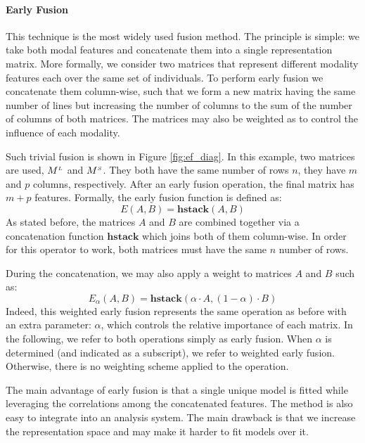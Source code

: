 \paragraph{Early Fusion}
This technique is the most widely used fusion method. The principle is simple: we take both modal features and concatenate them into a single representation matrix. More formally, we consider two matrices  that represent different modality features each  over the same set of individuals. To perform early fusion we concatenate them column-wise, such that we form a new matrix having the same number of lines but increasing the number of columns to the sum of the number of columns of both matrices. The matrices may also be weighted as to control the influence of each modality.

Such trivial fusion  is shown in Figure \ref{fig:ef_diag}. In this example, two  matrices are used, $M^{\scriptscriptstyle L}$ and $M^{\scriptscriptstyle S}$. They both have the same number of rows $n$, they have $m$ and $p$ columns, respectively. After an early fusion operation, the final matrix  has $m+p$ features. Formally, the early fusion function is defined as:
\begin{equation}
E(A,B) = \mathbf{hstack}(A , B)
\end{equation}
As stated before, the matrices $A$ and $B$ are combined together via a concatenation function $\mathbf{hstack}$ which joins both of them column-wise. In order for this operator to work, both matrices must have the same $n$ number of rows.

During the concatenation, we may also apply a weight to matrices $A$ and $B$ such as: 
\begin{equation}
E_\alpha(A,B) = \mathbf{hstack}(\alpha\cdot A , (1-\alpha)\cdot B)
\end{equation}
Indeed, this weighted early fusion  represents the same operation as before with an extra parameter: $\alpha$, which controls the relative importance of each matrix. In the following, we refer to both operations simply as early fusion. When $\alpha$ is determined (and indicated as a subscript), we refer to weighted early fusion. Otherwise, there is no weighting scheme applied to the operation.

The main advantage of early fusion is that a single unique model is fitted while leveraging the correlations among the concatenated features. The method is also easy to integrate into an analysis system. The main drawback is that we increase the representation space and may make it harder to fit models over it.

